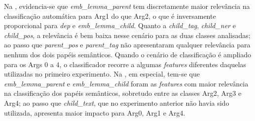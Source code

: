 Na , evidencia-se que \emph{emb\_lemma\_parent} tem
discretamente maior relevância na classificação automática para Arg1 do
que Arg2, o que é inversamente proporcional para \emph{dep} e
\emph{emb\_lemma\_child}. Quanto a \emph{child\_tag}, \emph{child\_ner}
e \emph{child\_pos}, a relevância é bem baixa nesse cenário para as duas
classes analisadas; ao passo que \emph{parent\_pos} e \emph{parent\_tag}
não apresentaram qualquer relevância para nenhum dos dois papéis
semânticos. Quando o cenário de classificação é ampliado para os Args 0
a 4, o classificador recorre a algumas \emph{features} diferentes
daquelas utilizadas no primeiro experimento. Na , em especial,
tem-se que \emph{emb\_lemma\_parent} e \emph{emb\_lemma\_child} foram as
\emph{features} com maior relevância na classificação dos papéis
semânticos, sobretudo entre as classes Arg2, Arg3 e Arg4; ao passo que
\emph{child\_text}, que no experimento anterior não havia sido
utilizada, apresenta maior impacto para Arg0, Arg1 e Arg4.
